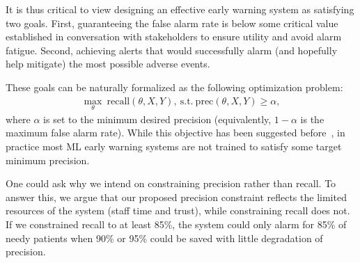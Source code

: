 It is thus critical to view designing an effective early warning system as satisfying two goals. First, guaranteeing the false alarm rate is below some critical value established in conversation with stakeholders to ensure utility and avoid alarm fatigue. Second, achieving alerts that would successfully alarm (and hopefully help mitigate) the most possible adverse events.

These goals can be naturally formalized as the following optimization problem:
\begin{align}
\label{eq:max_recall_st_precision}
\max_{\theta} ~\text{recall}(\theta, X, Y),
~\text{s.t.}~ \text{prec}(\theta, X, Y) \geq \alpha,
\end{align}
where $\alpha$ is set to the minimum desired precision (equivalently, $1-\alpha$ is the maximum false alarm rate).
While this objective has been suggested before~\citep{ebanScalableLearningNonDecomposable2017}, in practice most ML early warning systems are not trained to satisfy some target minimum precision. 

One could ask why we intend on constraining precision rather than recall. To answer this, we argue that our proposed precision constraint reflects the limited resources of the system (staff time and trust), while constraining recall does not. If we constrained recall to at least 85\%, the system could only alarm for 85\% of needy patients when 90\% or 95\% could be saved with little degradation of precision.



